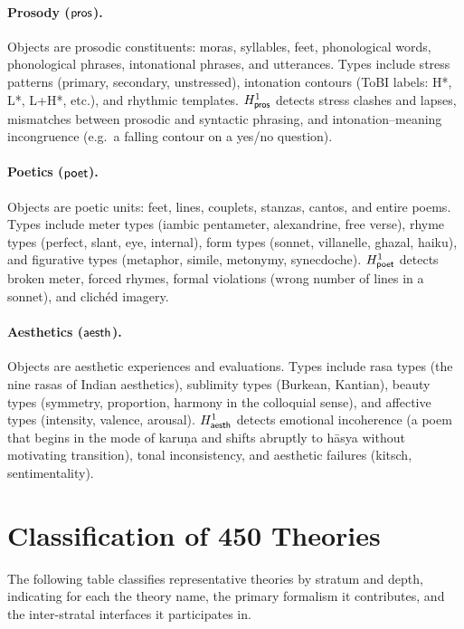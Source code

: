 \paragraph{Prosody ($\mathsf{pros}$).}
Objects are prosodic constituents: moras, syllables, feet,
phonological words, phonological phrases, intonational phrases, and
utterances.  Types include stress patterns (primary, secondary,
unstressed), intonation contours (ToBI labels: H*, L*, L+H*, etc.),
and rhythmic templates.  $H^1_{\mathsf{pros}}$ detects stress clashes and
lapses, mismatches between prosodic and syntactic phrasing, and
intonation--meaning incongruence (e.g.\ a falling contour on a
yes/no question).

\paragraph{Poetics ($\mathsf{poet}$).}
Objects are poetic units: feet, lines, couplets, stanzas, cantos,
and entire poems.  Types include meter types (iambic pentameter,
alexandrine, free verse), rhyme types (perfect, slant, eye, internal),
form types (sonnet, villanelle, ghazal, haiku), and figurative types
(metaphor, simile, metonymy, synecdoche).  $H^1_{\mathsf{poet}}$ detects
broken meter, forced rhymes, formal violations (wrong number of lines
in a sonnet), and clich\'{e}d imagery.

\paragraph{Aesthetics ($\mathsf{aesth}$).}
Objects are aesthetic experiences and evaluations.  Types include
rasa types (the nine rasas of Indian aesthetics), sublimity types
(Burkean, Kantian), beauty types (symmetry, proportion, harmony in
the colloquial sense), and affective types (intensity, valence,
arousal).  $H^1_{\mathsf{aesth}}$ detects emotional incoherence (a poem that
begins in the mode of karu\d{n}a and shifts abruptly to h\=asya
without motivating transition), tonal inconsistency, and aesthetic
failures (kitsch, sentimentality).

\section{Classification of 450 Theories}
\label{sec:450-classification}

The following table classifies representative theories by stratum and
depth, indicating for each the theory name, the primary formalism it
contributes, and the inter-stratal interfaces it participates in.

